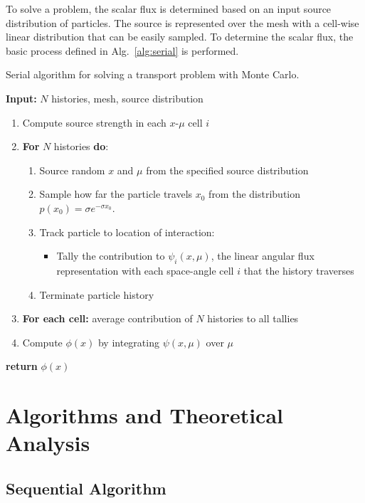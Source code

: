 \documentclass[12pt]{article}
\begin{document}
To solve a problem, the
scalar flux is determined based on an input source distribution of particles. The
source is represented
over the mesh with a cell-wise linear distribution that can be easily sampled.  To determine
the scalar flux, the basic process defined in 
Alg.~\ref{alg:serial} is performed.  
\begin{algorithm}[htbp!]
    \caption{\label{alg:serial}Serial algorithm for solving a transport problem with
    Monte Carlo.}
    \vspace{0.06in}
    \textbf{Input:} $N$ histories, mesh, source distribution
    \vspace{-0.1in}
    \begin{enumerate}
    \item Compute source strength in each $x$-$\mu$ cell $i$
    \item \textbf{For} {$N$ histories} \textbf{do}:
        \begin{enumerate}
       \item Source random $x$ and $\mu$ from the specified source distribution
    \item Sample how far the particle travels $x_0$ from the distribution $p(x_0) =
        \sigma e^{-\sigma x_0}$.
    \item Track particle to location of interaction:
        \begin{itemize}
            \item Tally the contribution to $\psi_i(x,\mu)$, the
                linear angular flux representation with each space-angle cell $i$
                that the history traverses
        \end{itemize}
    \item Terminate particle history
\end{enumerate}
    \item \textbf{For each cell:} average contribution of $N$ histories to all tallies
    \item Compute $\phi(x)$ by integrating $\psi(x,\mu)$ over $\mu$
\end{enumerate}
\vspace{-0.1in}
     \textbf{return} $\phi(x)$
\end{algorithm}

\section{Algorithms and Theoretical Analysis}

\subsection{Sequential Algorithm}
\end{document}
